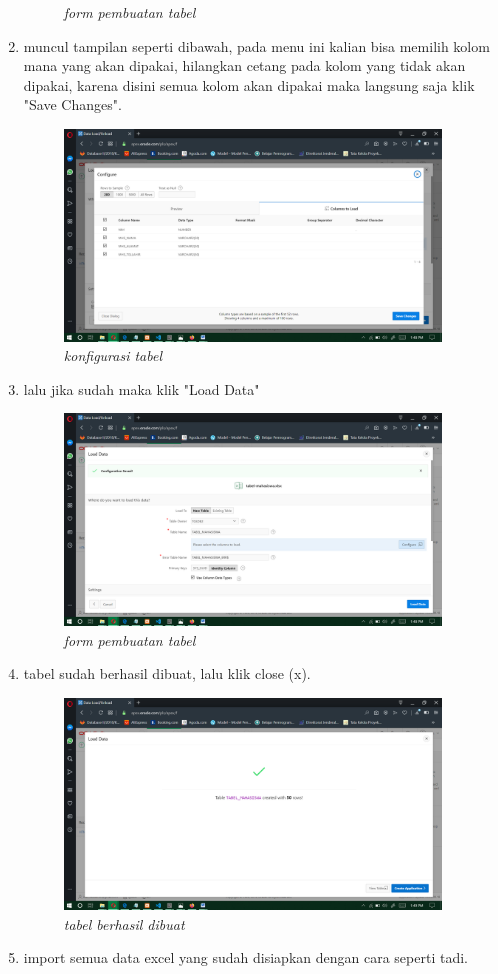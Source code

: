 \documentclass[12pt]{ociamthesis}  %
\begin{document}
\begin{enumerate}
\begin{figure}[H]
    \caption{\textit{form pembuatan tabel}}
    \label{foto18}
 	\end{figure}
	\item muncul tampilan seperti dibawah, pada menu ini kalian bisa memilih kolom mana yang akan dipakai, hilangkan cetang pada kolom yang tidak akan dipakai, karena disini semua kolom akan dipakai maka langsung saja klik "Save Changes".
	\begin{figure}[H]
    \centering
	\includegraphics[width=10cm]{figures/load data csv/Screenshot (213).png} 
    \caption{\textit{konfigurasi tabel}}
    \label{foto19}
 	\end{figure}
	\item lalu jika sudah maka klik "Load Data"
	\begin{figure}[H]
    \centering
	\includegraphics[width=10cm]{figures/load data csv/Screenshot (214).png} 
    \caption{\textit{form pembuatan tabel}}
    \label{foto20}
 	\end{figure}
	\item tabel sudah berhasil dibuat, lalu klik close (x).
	\begin{figure}[H]
    \centering
	\includegraphics[width=10cm]{figures/load data csv/Screenshot (215).png} 
    \caption{\textit{tabel berhasil dibuat}}
    \label{foto21}
 	\end{figure}
	\item import semua data excel yang sudah disiapkan dengan cara seperti tadi.
	
	
\end{enumerate}
\end{document}
